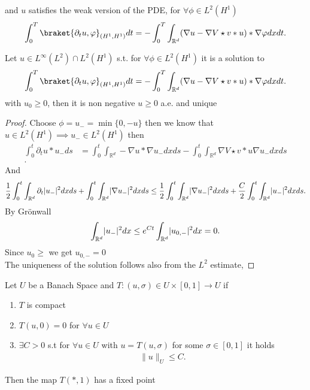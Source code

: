   and $u$ satisfies the weak version of the PDE, for $\forall  \phi \in  L^{2}(H^{1} ) $
   \begin{align*}
     \int_0^{T}    \braket{\partial_t u , \phi }_{(H^{1},H^{1}  )} dt = -\int_0^{T} \int_{\mathbb{R}^{d} }   (\nabla u -\nabla V \star v * u) *\nabla \phi  dx dt
   .\end{align*}
   \begin{lemma}
   Let $u \in L^{\infty}(L^{2} ) \cap L^{2}(H^{1} ) $ s.t. for $\forall  \phi \in  L^{2}(H^{1} ) $ it is a solution to 
   \begin{align*} 
     \int_0^{T}    \braket{\partial_t u , \phi }_{(H^{1},H^{1}  )} dt = -\int_0^{T} \int_{\mathbb{R}^{d} }   (\nabla u -\nabla V \star v * u) *\nabla \phi  dx dt
   .\end{align*}
   with $u_{0} \ge  0$, then it is non negative $u \ge 0$ a.e. and unique 
   \end{lemma}
   \begin{proof}
     Choose $\phi  = u_{-} = \min \{0,-u\}  $  then we know that $u \in  L^{2}(H^{1} ) \implies u_{-} \in  L^{2}(H^{1} ) $ 
     then 
     \begin{align*}
       \int_0^{t}  \partial_t u * u_{-} ds &= \int_0^{t}  \int_{\mathbb{R}^{d} } - \nabla u * \nabla u_{-} dx ds - \int_{0}^{t}  \int_{\mathbb{R}^{d} } \nabla V \star  v * u \nabla u_{-} dx ds \\
     .\end{align*}
     And 
     \begin{align*}
       \frac{1}{2}\int_0^{t} \int_{\mathbb{R}^{d} } \partial_t \lvert u_{-}\rvert^2 dx ds+ \int_0^{t}  \int_{\mathbb{R}^{d} } \lvert\nabla u_{-}\rvert^2 dx ds \le \frac{1}{2}\int_0^{t}  \int_{\mathbb{R}^{d} } \lvert\nabla u_{-}\rvert^2 dx ds + \frac{C}{2} \int_0^{t} \int_{\mathbb{R}^{d} }\lvert u_{-}\rvert^2 dx ds
     .\end{align*}
     By Grönwall 
     \begin{align*}
       \int_{\mathbb{R}^{d} } \lvert u_-\rvert^2 dx \le  e^{Ct} \int_{\mathbb{R}^{d} } \lvert u_{0,-}\rvert^2 dx = 0
     .\end{align*}
     Since $u_0 \ge $ we get $u_{0,-} = 0$\\[1ex]
     The uniqueness of the solution follows also from the $L^2$ estimate,
   \end{proof}
   \spewnotes
   \begin{theorem}\label{schauder_fixpoint}
     Let $U$ be a Banach Space and $T: (u,\sigma ) \in  U \times  [0,1] \to U$ if 
     \begin{enumerate}
      \item $T$ is compact 
      \item $T(u,0) = 0$ for $\forall  u \in  U$
      \item  $\exists  C >0$ s.t for $\forall  u \in  U$ with $u=T(u,\sigma )$ for some $\sigma  \in  [0,1]$ it holds 
        \begin{align*}
          \|u\|_{U} \le C
        .\end{align*}
     \end{enumerate}
     Then the map $T(*,1)$ has a fixed point
   \end{theorem}
